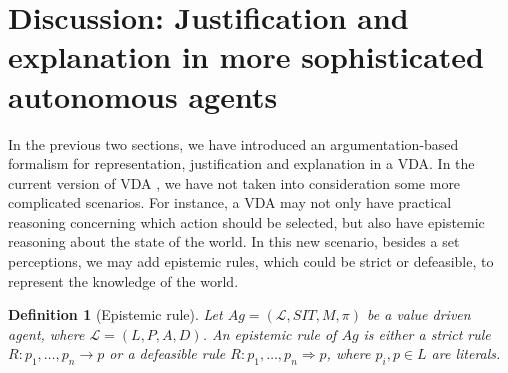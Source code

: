 \documentclass[letterpaper]{article} %
\newtheorem{definition}{Definition}
\begin{document}

\section{Discussion: Justification and explanation in more sophisticated autonomous agents}
In the previous two sections, we have introduced an argumentation-based formalism for representation, justification and explanation in a VDA. In the current version of VDA \cite{DBLP:journals/pieee/Anderson19}, we have not taken into consideration some more complicated scenarios. For instance, a VDA may not only have practical reasoning concerning which action should be selected, but also have epistemic reasoning about the state of the world. 
In this new scenario, besides a set perceptions, we may add epistemic rules, which could be strict or defeasible, to represent the knowledge of the world. 

\begin{definition}[Epistemic rule]
Let $Ag = (\mathcal{L},  SIT, M, \pi)$ be a value driven agent, where $\mathcal{L} = (L, P, A, D)$. 
An epistemic rule of $Ag$ is either a strict rule $R: p_1, \dots, p_n \rightarrow  p$ or a defeasible rule $R: p_1, \dots, p_n \Rightarrow  p$, where  $p_i, p\in L$ are literals.  
\end{definition}

\end{document}
